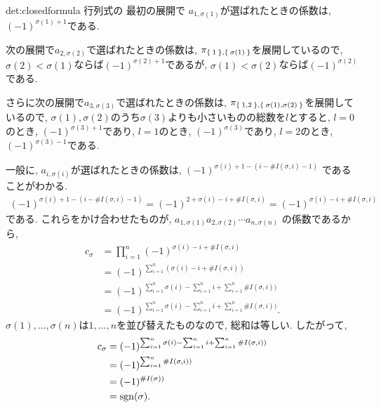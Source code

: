 \begin{proofof}{det:closedformula}
  行列式の
  最初の展開で
  $a_{1,\sigma(1)}$が選ばれたときの係数は,
  $(-1)^{\sigma(1)+1}$である.
  
  次の展開で$a_{2,\sigma(2)}$で選ばれたときの係数は,
  $\pi_{\Set{1},\Set{\sigma(1)}}$を展開しているので,
  $\sigma(2)<\sigma(1)$ならば$(-1)^{\sigma(2)+1}$であるが,
  $\sigma(1)<\sigma(2)$ならば$(-1)^{\sigma(2)}$である.

  さらに次の展開で$a_{3,\sigma(3)}$で選ばれたときの係数は,
  $\pi_{\Set{1,2},\Set{\sigma(1),\sigma(2)}}$を展開しているので,
  $\sigma(1),\sigma(2)$のうち$\sigma(3)$よりも小さいものの総数を$l$とすると,
  $l=0$のとき, $(-1)^{\sigma(3)+1}$であり,
  $l=1$のとき, $(-1)^{\sigma(3)}$であり,
  $l=2$のとき, $(-1)^{\sigma(3)-1}$である.

  一般に, $a_{i,\sigma(i)}$が選ばれたときの係数は,
  $(-1)^{\sigma(i)+1-(i-\#I(\sigma,i)-1)}$
  であることがわかる.
  \begin{align*}
    (-1)^{\sigma(i)+1-(i-\#I(\sigma,i)-1)}
    =(-1)^{2+\sigma(i)-i+\#I(\sigma,i)}
    =(-1)^{\sigma(i)-i+\#I(\sigma,i)}
  \end{align*}
  である.
  これらをかけ合わせたものが,
  $a_{1,\sigma(1)}a_{2,\sigma(2)}\cdots a_{n,\sigma(n)}$
  の係数であるから,
  \begin{align*}
    c_\sigma
    &=\prod_{i=1}^n
    (-1)^{\sigma(i)-i+\#I(\sigma,i)}\\
    &=
    (-1)^{\sum_{i=1}^n(\sigma(i)-i+\#I(\sigma,i))}\\
    &=
    (-1)^{\sum_{i=1}^n\sigma(i)-\sum_{i=1}^n i+\sum_{i=1}^n \#I(\sigma,i))}\\
    &=
    (-1)^{\sum_{i=1}^n\sigma(i)-\sum_{i=1}^n i+\sum_{i=1}^n \#I(\sigma,i))}.
  \end{align*}
  $\sigma(1),\ldots,\sigma(n)$は$1,\ldots,n$を並び替えたものなので,
  総和は等しい. したがって,
  \begin{align*}
    c_\sigma&=(-1)^{\sum_{i=1}^n\sigma(i)-\sum_{i=1}^n i+\sum_{i=1}^n \#I(\sigma,i))}\\
    &=
    (-1)^{\sum_{i=1}^n \#I(\sigma,i))}\\
    &=
    (-1)^{ \#I(\sigma))}\\
    &=\operatorname{sgn}(\sigma).
  \end{align*}
\end{proofof}

